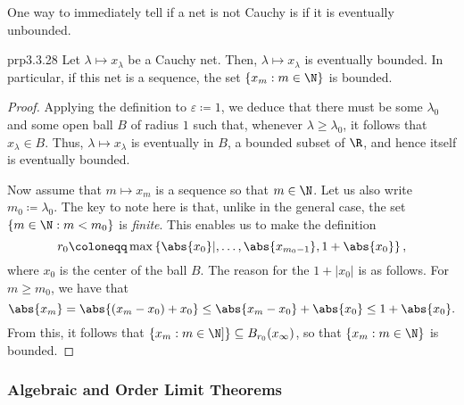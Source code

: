 One way to immediately tell if a net is not Cauchy is if it is eventually unbounded. 
\begin{prp}{}{prp3.3.28}
Let $\lambda \mapsto x_\lambda$ be a Cauchy net.  Then, $\lambda \mapsto x_\lambda$ is eventually bounded.  In particular, if this net is a sequence, the set $\left\{ x_m :m\in \N \right\}$ is bounded.
\begin{proof}
Applying the definition to $\varepsilon \coloneqq 1$, we deduce that there must be some $\lambda _0$ and some open ball $B$ of radius $1$ such that, whenever $\lambda \geq \lambda _0$, it follows that $x_\lambda \in B$.  Thus, $\lambda \mapsto x_\lambda$ is eventually in $B$, a bounded subset of $\R$, and hence itself is eventually bounded.

Now assume that $m\mapsto x_m$ is a sequence so that $m\in \N$.  Let us also write $m_0\coloneqq \lambda _0$.  The key to note here is that, unlike in the general case, the set $\{ m\in \N :m<m_0\}$ is \emph{finite}.  This enables us to make the definition
\begin{equation}
r_0\coloneqq \max \left\{ \abs{x_0}|,\ldots ,\abs{x_{m_0-1}},1+\abs{x_0}\right\} ,
\end{equation}
where $x_0$ is the center of the ball $B$.  The reason for the $1+|x_0|$ is as follows.  For $m\geq m_0$, we have that
\begin{equation}
\abs{x_m}=\abs{(x_m-x_0)+x_0}\leq \abs{x_m-x_0}+\abs{x_0}\leq 1+\abs{x_0}.
\end{equation}
From this, it follows that $\left\{ x_m:m\in \N ]\right\} \subseteq B_{r_0}(x_\infty)$, so that $\left\{ x_m:m\in \N \right\}$ is bounded.
\end{proof}
\end{prp}

\subsubsection{Algebraic and Order Limit Theorems}

